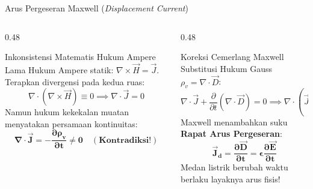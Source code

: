 \documentclass[aspectratio=169,10pt]{beamer}
\begin{document}
\begin{frame}{Arus Pergeseran Maxwell (\textit{Displacement Current})}
  \begin{columns}[t]
    \begin{column}{0.48\textwidth}
      \begin{block}{Inkonsistensi Matematis Hukum Ampere Lama}
        \small
        Hukum Ampere statik: $\nabla \times \vec{H} = \vec{J}$.\\
        Terapkan divergensi pada kedua ruas:
        \begin{equation*}
          \nabla \cdot (\nabla \times \vec{H}) \equiv 0 \implies \nabla \cdot \vec{J} = 0
        \end{equation*}
        Namun hukum kekekalan muatan menyatakan persamaan kontinuitas:
        \begin{equation*}
          \mathbf{\nabla \cdot \vec{J} = -\frac{\partial \rho_v}{\partial t} \ne 0 \quad (\text{Kontradiksi!})}
        \end{equation*}
      \end{block}
    \end{column}
    \begin{column}{0.48\textwidth}
      \begin{alertblock}{Koreksi Cemerlang Maxwell}
        \small
        Substitusi Hukum Gauss $\rho_v = \nabla \cdot \vec{D}$:
        \begin{equation*}
          \nabla \cdot \vec{J} + \frac{\partial}{\partial t}(\nabla \cdot \vec{D}) = 0 \implies \nabla \cdot \left(\vec{J} + \frac{\partial \vec{D}}{\partial t}\right) = 0
        \end{equation*}
        Maxwell menambahkan suku \textbf{Rapat Arus Pergeseran}:
        \begin{equation*}
          \mathbf{\vec{J}_d = \frac{\partial \vec{D}}{\partial t} = \epsilon \frac{\partial \vec{E}}{\partial t}}
        \end{equation*}
        Medan listrik berubah waktu berlaku layaknya arus fisis!
      \end{alertblock}
    \end{column}
  \end{columns}
\end{frame}
\end{document}
